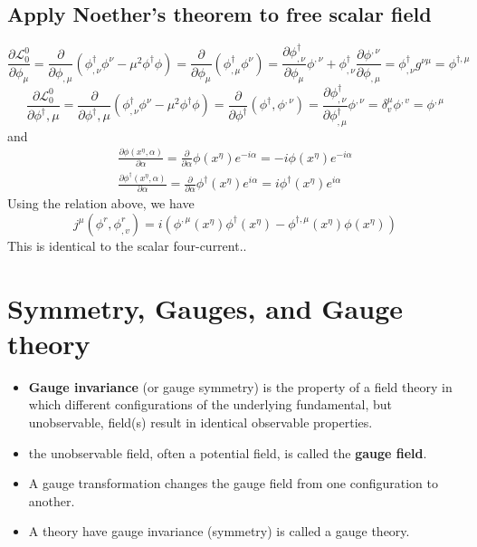 \subsection{Apply Noether's theorem to free scalar field}
$$
\frac{\partial \mathcal{L}_{0}^{0}}{\partial \phi_{\mu}}=\frac{\partial}{\partial \phi_{, \mu}}\left(\phi_{, \nu}^{\dagger} \phi^{\nu}-\mu^{2} \phi^{\dagger} \phi\right)=\frac{\partial}{\partial \phi_{\mu}}\left(\phi_{, \mu}^{\dagger} \phi^{\nu}\right)
=\frac{\partial \phi_{, \nu}^{\dagger}}{\partial \phi_{\mu}} \phi^{,\nu}+\phi_{, \nu}^{\dagger} \frac{\partial \phi^{,\nu}}{\partial \phi_{,\mu}}=\phi_{, \nu}^{\dagger} g^{\nu \mu}=\phi^{\dagger, \mu}
$$
$$
\frac{\partial \mathcal{L}_{0}^{0}}{\partial \phi^{\dagger}, \mu}=\frac{\partial}{\partial \phi^{\dagger}, \mu}\left(\phi_{, \nu}^{\dagger} \phi^{\nu}-\mu^{2} \phi^{\dagger} \phi\right)=\frac{\partial}{\partial \phi^{\dagger}}\left(\phi^{\dagger}, \phi^{,\nu}\right)=\frac{\partial \phi^{\dagger}_{, \nu}}{\partial \phi^{\dagger}_{, \mu}} \phi^{,\nu}=\delta_{v}^{\mu} \phi^{, v}=\phi^{,\mu}
$$
and
$$
\begin{array}{l}
{\frac{\partial \phi\left(x^{\eta}, \alpha\right)}{\partial \alpha}=\frac{\partial}{\partial \alpha} \phi\left(x^{\eta}\right) e^{-i \alpha}=-i \phi\left(x^{\eta}\right) e^{-i \alpha}} \\
{\frac{\partial \phi^{\dagger}\left(x^{\eta}, \alpha\right)}{\partial \alpha}=\frac{\partial}{\partial \alpha} \phi^{\dagger}\left(x^{\eta}\right) e^{i \alpha}=i \phi^{\dagger}\left(x^{\eta}\right) e^{i \alpha}}
\end{array}
$$
Using the relation above, we have
$$
j^{\mu}\left(\phi^{r}, \phi^{r}_{,v}\right)=i\left(\phi^{,\mu}\left(x^{\eta}\right) \phi^{\dagger}\left(x^{\eta}\right)-\phi^{\dagger, \mu}\left(x^{\eta}\right) \phi\left(x^{\eta}\right)\right)
$$
This is identical to the scalar four-current..
\section{Symmetry, Gauges, and Gauge theory}
\begin{itemize}
    \item \textbf{Gauge invariance }(or gauge symmetry) is the property of a field theory in which different configurations of the underlying fundamental, but unobservable, field(s) result in identical observable properties.
    \item the unobservable field, often a potential field, is called the\textbf{ gauge field}.
    \item A gauge transformation changes the gauge field from one configuration to another. 
    \item A theory have gauge invariance (symmetry) is called a gauge theory.
\end{itemize}
